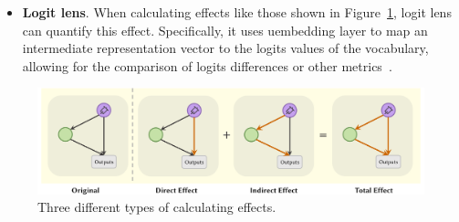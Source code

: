 \begin{itemize}
    \item \textbf{Logit lens}. When calculating effects like those shown in Figure~\ref{fig:ThreeEffect}, logit lens can quantify this effect. Specifically, it uses uembedding layer to map an intermediate representation vector to the logits values of the vocabulary, allowing for the comparison of logits differences or other metrics~\citep{LogitLens_colab}.
\end{itemize}

\begin{figure}[htbp]
    \centering
    \includegraphics[width=0.9\linewidth]{figures/ThreeEffect.pdf}
    \caption{Three different types of calculating effects.}
    \label{fig:ThreeEffect}
\end{figure}